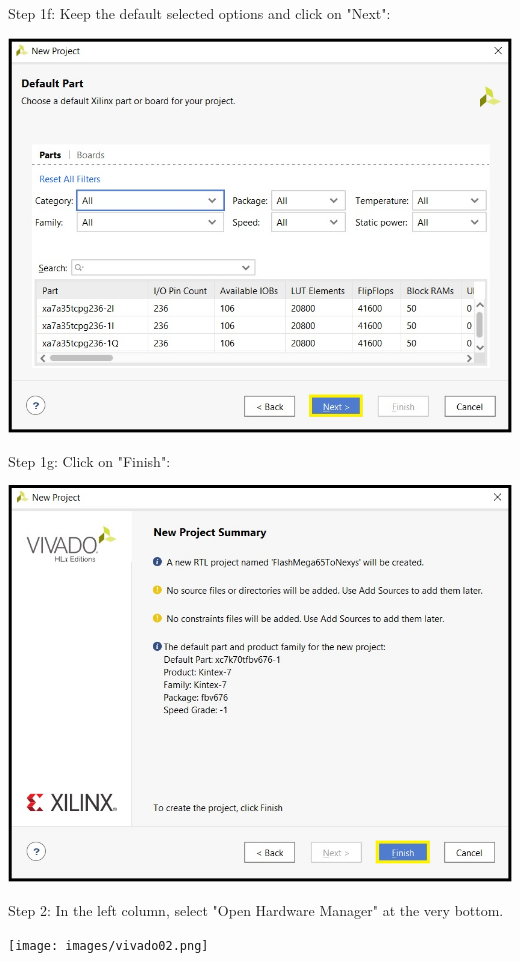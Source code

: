 \begin{minipage}{\linewidth}
  Step 1f: Keep the default selected options and click on "Next": \\
  \begin{center}
    \includegraphics[width=0.7\linewidth]{images/vivado01f.png}
  \end{center}
\end{minipage}

\begin{minipage}{\linewidth}
  Step 1g: Click on "Finish": \\
  \begin{center}
    \includegraphics[width=0.8\linewidth]{images/vivado01g.png}
  \end{center}
\end{minipage}

\vspace{5mm}

\begin{minipage}{\linewidth}
  Step 2: In the left column, select "Open Hardware Manager"
  at the very bottom.
  \\
  \begin{center}
    \texttt{[image: images/vivado02.png]}
  \end{center}
\end{minipage}



